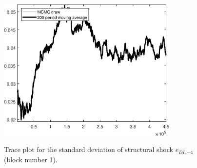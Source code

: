 \begin{figure}[H]
\centering
  \includegraphics[width=0.8\textwidth]{BRS_sectoral_wo_vcu/graphs/TracePlot_SE_e_DI_news_blck_1}\\
    \caption{Trace plot for the standard deviation of structural shock ${e_{DI,-4}}$ (block number 1).}
\end{figure}
